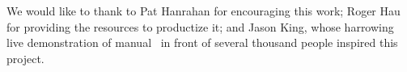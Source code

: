 We would like to thank to Pat Hanrahan for encouraging this work; Roger Hau for providing the resources to productize it; and Jason King, whose harrowing live demonstration of manual \dateparse\ in front of several thousand people inspired this project.
